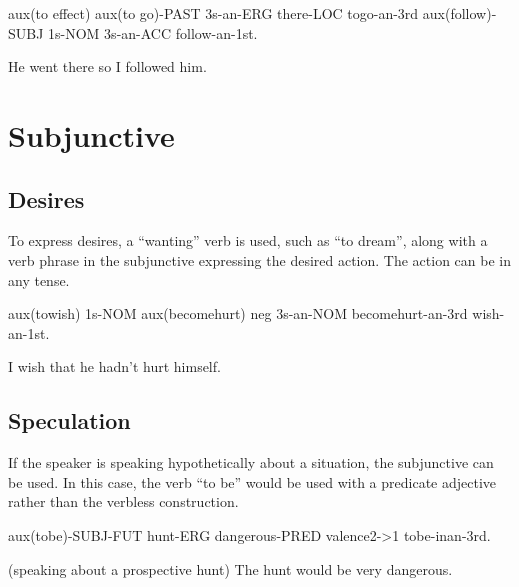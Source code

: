 aux(to effect) aux(to go)-PAST 3s-an-ERG there-LOC togo-an-3rd aux(follow)-SUBJ
1s-NOM 3s-an-ACC follow-an-1st.

He went there so I followed him.

\section{Subjunctive}

\subsection{Desires}

To express desires, a ``wanting'' verb is used, such as ``to dream'', along with
a verb phrase in the subjunctive expressing the desired action. The action can
be in any tense.

aux(towish) 1s-NOM aux(becomehurt) neg 3s-an-NOM becomehurt-an-3rd wish-an-1st.

I wish that he hadn't hurt himself.

\subsection{Speculation}

If the speaker is speaking hypothetically about a situation, the subjunctive can
be used. In this case, the verb ``to be'' would be used with a predicate
adjective rather than the verbless construction.

aux(tobe)-SUBJ-FUT hunt-ERG dangerous-PRED valence2->1 tobe-inan-3rd.

(speaking about a prospective hunt) The hunt would be very dangerous.
